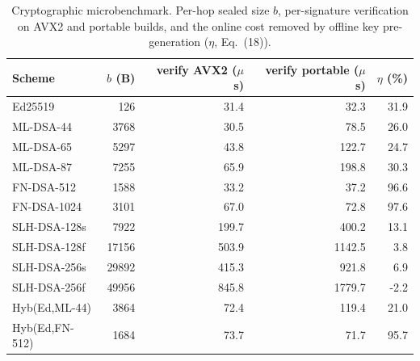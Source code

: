 \begin{table}[t]
\centering\small
\caption{Cryptographic microbenchmark. Per-hop sealed size $b$, per-signature verification on AVX2 and portable builds, and the online cost removed by offline key pre-generation ($\eta$, Eq.~(18)).}
\label{tab:micro}
\begin{tabular}{lrrrr}
\hline
Scheme & $b$ (B) & verify AVX2 ($\mu$s) & verify portable ($\mu$s) & $\eta$ (\%)\\
\hline
Ed25519 & 126 & 31.4 & 32.3 & 31.9 \\
ML-DSA-44 & 3768 & 30.5 & 78.5 & 26.0 \\
ML-DSA-65 & 5297 & 43.8 & 122.7 & 24.7 \\
ML-DSA-87 & 7255 & 65.9 & 198.8 & 30.3 \\
FN-DSA-512 & 1588 & 33.2 & 37.2 & 96.6 \\
FN-DSA-1024 & 3101 & 67.0 & 72.8 & 97.6 \\
SLH-DSA-128s & 7922 & 199.7 & 400.2 & 13.1 \\
SLH-DSA-128f & 17156 & 503.9 & 1142.5 & 3.8 \\
SLH-DSA-256s & 29892 & 415.3 & 921.8 & 6.9 \\
SLH-DSA-256f & 49956 & 845.8 & 1779.7 & -2.2 \\
Hyb(Ed,ML-44) & 3864 & 72.4 & 119.4 & 21.0 \\
Hyb(Ed,FN-512) & 1684 & 73.7 & 71.7 & 95.7 \\
\hline
\end{tabular}
\end{table}
